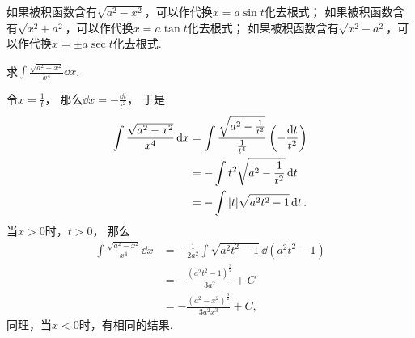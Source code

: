 \begin{remark}
如果被积函数含有\(\sqrt{a^2 - x^2}\)，可以作代换\(x = a \sin t\)化去根式；
如果被积函数含有\(\sqrt{x^2 + a^2}\)，可以作代换\(x=a \tan t\)化去根式；
如果被积函数含有\(\sqrt{x^2 - a^2}\)，可以作代换\(x=\pm a \sec t\)化去根式.
\end{remark}

\begin{example}
求\(\int \frac{\sqrt{a^2 - x^2}}{x^4} \dd{x}\).
\begin{solution}
令\(x = \frac{1}{t}\)，
那么\(\dd{x} = -\frac{\dd{t}}{t^2}\)，
于是\begin{align*}
	\int \frac{\sqrt{a^2 - x^2}}{x^4} \dd{x}
	&= \int \frac{\sqrt{a^2 - \frac{1}{t^2}}}{\frac{1}{t^4}}
		\left( -\frac{\dd{t}}{t^2} \right) \\
	&= -\int t^2 \sqrt{a^2 - \frac{1}{t^2}} \dd{t} \\
	&= -\int \abs{t} \sqrt{a^2 t^2 - 1} \dd{t}.
\end{align*}
当\(x > 0\)时，\(t > 0\)，
那么\begin{align*}
	\int \frac{\sqrt{a^2 - x^2}}{x^4} \dd{x}
	&= -\frac{1}{2a^2} \int \sqrt{a^2 t^2 - 1} \dd(a^2 t^2 - 1) \\
	&= -\frac{(a^2 t^2 - 1)^{\frac32}}{3 a^2} + C \\
	&= -\frac{(a^2 - x^2)^{\frac32}}{3 a^2 x^3} + C,
\end{align*}
同理，当\(x < 0\)时，有相同的结果.
\end{solution}
\end{example}
